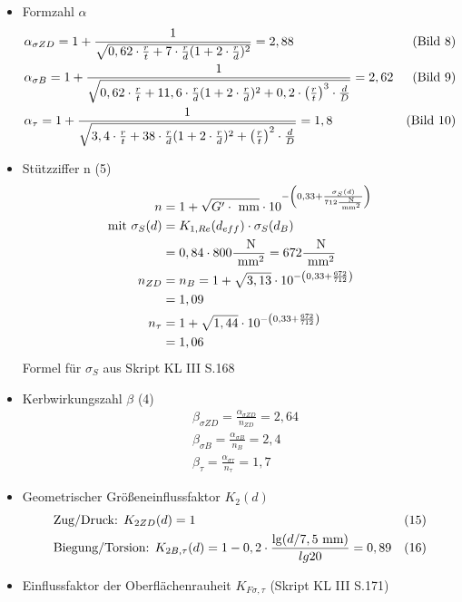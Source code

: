 \begin{itemize}
	
	\item Formzahl $\alpha$
	\begin{align*}
	&\alpha_{\sigma ZD} = 1 + \frac{1}{\sqrt{0,62 \cdot \frac{r}{t} + 7 \cdot \frac{r}{d} (1+2 \cdot \frac{r}{d})^2}} = 2,88 & \text{(Bild 8)} \\
	&\alpha_{\sigma B} = 1 + \frac{1}{\sqrt{0,62 \cdot \frac{r}{t} + 11,6 \cdot \frac{r}{d} (1+2 \cdot \frac{r}{d})^2 + 0,2 \cdot \left( \frac{r}{t} \right) ^3 \cdot \frac{d}{D}}} = 2,62 & \text{(Bild 9)} \\
	&\alpha_{\tau} = 1 + \frac{1}{\sqrt{3,4 \cdot \frac{r}{t} + 38 \cdot \frac{r}{d} (1+2 \cdot \frac{r}{d})^2 + \left( \frac{r}{t} \right) ^2 \cdot \frac{d}{D}}} = 1,8  & \text{(Bild 10)} 
	\end{align*}
	\item Stützziffer n \hfill (5)
	\begin{align*}
	n&= 1 + \sqrt{G' \cdot \text{ mm}} \cdot 10 ^{-\left( 0,33 + \frac{\sigma_S (d)}{712\frac{\text{ N}}{\text{ mm}^2}} \right)} \\
	\text{mit } \sigma_S (d) &= K_{1,Re} (d_{eff}) \cdot \sigma_S (d_B) \\
	&= 0,84 \cdot 800 \frac{\text{ N}}{\text{ mm}^2} = 672 \frac{\text{ N}}{\text{ mm}^2} \\
	n_{ZD} &= n_B = 1 + \sqrt{3,13} \cdot 10 ^{-\left( 0,33 + \frac{672}{712} \right)} \\
	&=1,09 \\
	n_{\tau} &= 1 + \sqrt{1,44} \cdot 10 ^{-\left( 0,33 + \frac{672}{712} \right)} \\
	&= 1,06 
	\end{align*}
	Formel für $\sigma_S$ aus Skript KL III  S.168
	\item Kerbwirkungszahl $\beta$ \hfill (4)
	\begin{align*}
	&\beta_{\sigma ZD} = \frac{\alpha_{\sigma ZD}}{n_{ZD}} = 2,64 \\
	&\beta_{\sigma B} = \frac{\alpha_{\sigma B}}{n_{B}} = 2,4 \\
	&\beta_{ \tau} = \frac{\alpha_{\sigma \tau}}{n_{\tau}} = 1,7 
	\end{align*}
	\item Geometrischer Größeneinflussfaktor $K_2 (d)$ 
	\begin{align*}
	&\text{Zug/Druck: }K_{2ZD} (d) = 1 & (15) \\
	&\text{Biegung/Torsion: } K_{2B,\tau} (d) = 1 -0,2 \cdot  \frac{\lg (d / 7,5 \text{ mm})}{lg 20}  = 0,89 &(16) 
	\end{align*}
	\item Einflussfaktor der Oberflächenrauheit $K_{F\sigma, \tau}$ (Skript KL III  S.171)

\end{itemize}
